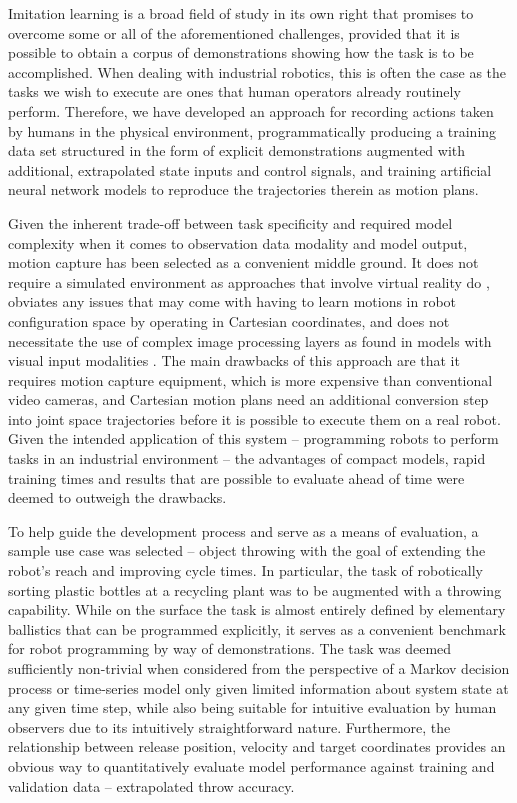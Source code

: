 \documentclass{article}
\begin{document}
Imitation learning is a broad field of study in its own right that promises to overcome some or all of the aforementioned challenges, provided that it is possible to obtain a corpus of demonstrations showing how the task is to be accomplished. When dealing with industrial robotics, this is often the case as the tasks we wish to execute are ones that human operators already routinely perform. Therefore, we have developed an approach for recording actions taken by humans in the physical environment, programmatically producing a training data set structured in the form of explicit demonstrations augmented with additional, extrapolated state inputs and control signals, and training artificial neural network models to reproduce the trajectories therein as motion plans.

Given the inherent trade-off between task specificity and required model complexity when it comes to observation data modality and model output, motion capture has been selected as a convenient middle ground. It does not require a simulated environment as approaches that involve virtual reality do \citep{zhang2018deep,dyrstad2018teaching}, obviates any issues that may come with having to learn motions in robot configuration space by operating in Cartesian coordinates, and does not necessitate the use of complex image processing layers as found in models with visual input modalities \citep{liu2018imitation, zhang2018deep}. The main drawbacks of this approach are that it requires motion capture equipment, which is more expensive than conventional video cameras, and Cartesian motion plans need an additional conversion step into joint space trajectories before it is possible to execute them on a real robot. Given the intended application of this system -- programming robots to perform tasks in an industrial environment -- the advantages of compact models, rapid training times and results that are possible to evaluate ahead of time were deemed to outweigh the drawbacks.

To help guide the development process and serve as a means of evaluation, a sample use case was selected -- object throwing with the goal of extending the robot's reach and improving cycle times. In particular, the task of robotically sorting plastic bottles at a recycling plant was to be augmented with a throwing capability. While on the surface the task is almost entirely defined by elementary ballistics that can be programmed explicitly, it serves as a convenient benchmark for robot programming by way of demonstrations. The task was deemed sufficiently non-trivial when considered from the perspective of a Markov decision process or time-series model only given limited information about system state at any given time step, while also being suitable for intuitive evaluation by human observers due to its intuitively straightforward nature. Furthermore, the relationship between release position, velocity and target coordinates provides an obvious way to quantitatively evaluate model performance against training and validation data -- extrapolated throw accuracy.
\end{document}
